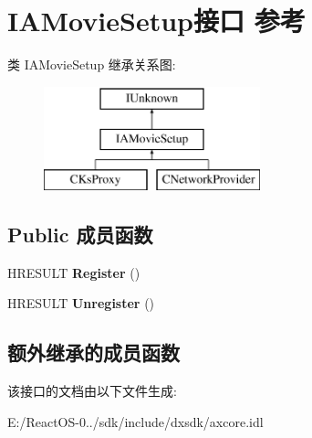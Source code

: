 \hypertarget{interface_i_a_movie_setup}{}\section{I\+A\+Movie\+Setup接口 参考}
\label{interface_i_a_movie_setup}
类 I\+A\+Movie\+Setup 继承关系图\+:\begin{figure}[H]
\begin{center}
\leavevmode
\includegraphics[height=3.000000cm]{interface_i_a_movie_setup}
\end{center}
\end{figure}
\subsection*{Public 成员函数}
\begin{DoxyCompactItemize}
\item 
\mbox{\label{interface_i_a_movie_setup_ae8570c636a80b2f9cf0723a7cad1bd3b}} 
H\+R\+E\+S\+U\+LT {\bfseries Register} ()
\item 
\mbox{\label{interface_i_a_movie_setup_a31ec38249252e5ee4a62cac8f4e8fcdf}} 
H\+R\+E\+S\+U\+LT {\bfseries Unregister} ()
\end{DoxyCompactItemize}
\subsection*{额外继承的成员函数}


该接口的文档由以下文件生成\+:\begin{DoxyCompactItemize}
\item 
E\+:/\+React\+O\+S-\/0../sdk/include/dxsdk/axcore.\+idl\end{DoxyCompactItemize}
